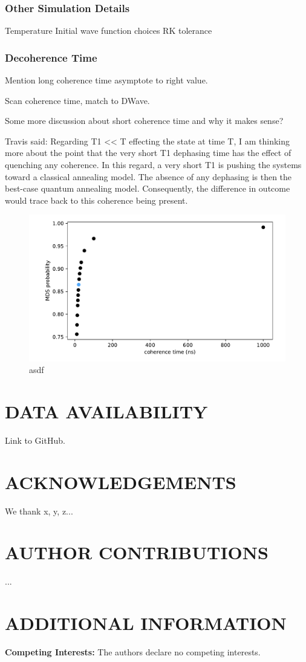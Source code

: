 \documentclass[prd,twocolumn,tightenlines,preprintnumbers,showpacs,superscriptaddress,notitlepage,nofootinbib,eqsecnum,floatfix,longbibliography]{revtex4}
\begin{document}
\subsubsection{Other Simulation Details}
Temperature
Initial wave function choices
RK tolerance

\subsubsection{Decoherence Time}
\label{sec:methods:deco}

Mention long coherence time asymptote to right value.

Scan coherence time, match to DWave.

Some more discussion about short coherence time and why it makes sense?

Travis said: Regarding T1 << T effecting the state at time T, I am thinking more about the point that the very short T1 dephasing time has the effect of quenching any coherence.
In this regard, a very short T1 is pushing the systems toward a classical annealing model.
The absence of any dephasing is then the best-case quantum annealing model.
Consequently, the difference in outcome would trace back to this coherence being present.

\begin{figure}
    \centering
    \includegraphics[width=\columnwidth]{./figures/coherence.pdf}
    \caption{asdf}
    \label{fig:prob_mi}
\end{figure}

\section{DATA AVAILABILITY}

Link to GitHub.

\section{ACKNOWLEDGEMENTS}

We thank x, y, z...

\section{AUTHOR CONTRIBUTIONS}

...

\section{ADDITIONAL INFORMATION}

\textbf{Competing Interests:} The authors declare no competing interests.


\end{document}
